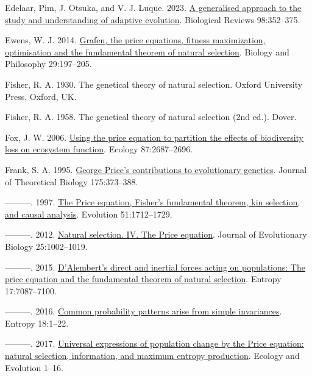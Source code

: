 \documentclass[
]{article}
\newlength{\cslhangindent}
\newenvironment{CSLReferences}[2] %
 {\begin{list}{}{%
  \setlength{\itemindent}{0pt}
  \setlength{\leftmargin}{0pt}
  \setlength{\parsep}{0pt}
  \ifodd #1
   \setlength{\leftmargin}{\cslhangindent}
   \setlength{\itemindent}{-1\cslhangindent}
  \fi
  \setlength{\itemsep}{#2\baselineskip}}}
 {\end{list}}
\begin{document}
\begin{CSLReferences}{0}{0}
Edelaar, Pim, J. Otsuka, and V. J. Luque. 2023.
\href{https://doi.org/10.1111/brv.12910}{{A generalised approach to the
study and understanding of adaptive evolution}}. Biological Reviews
98:352--375.

Ewens, W. J. 2014.
\href{https://doi.org/10.1007/s10539-013-9412-0}{Grafen, the price
equations, fitness maximization, optimisation and the fundamental
theorem of natural selection}. Biology and Philosophy 29:197--205.

Fisher, R. A. 1930. The genetical theory of natural selection. Oxford
University Press, Oxford, UK.

Fisher, R. A. 1958. The genetical theory of natural selection (2nd ed.).
Dover.

Fox, J. W. 2006.
\href{https://doi.org/10.1890/0012-9658(2006)87\%5B2687:utpetp\%5D2.0.co;2}{{Using
the price equation to partition the effects of biodiversity loss on
ecosystem function}}. Ecology 87:2687--2696.

Frank, S. A. 1995. \href{https://doi.org/10.1006/jtbi.1995.0148}{{George
Price's contributions to evolutionary genetics}}. Journal of Theoretical
Biology 175:373--388.

---------. 1997.
\href{https://doi.org/10.1111/j.1558-5646.1997.tb05096.x}{{The Price
equation, Fisher's fundamental theorem, kin selection, and causal
analysis}}. Evolution 51:1712--1729.

---------. 2012.
\href{https://doi.org/10.1111/j.1420-9101.2012.02498.x}{{Natural
selection. IV. The Price equation}}. Journal of Evolutionary Biology
25:1002--1019.

---------. 2015. \href{https://doi.org/10.3390/e17107087}{{D'Alembert's
direct and inertial forces acting on populations: The price equation and
the fundamental theorem of natural selection}}. Entropy 17:7087--7100.

---------. 2016. \href{https://doi.org/10.3390/e18050192}{{Common
probability patterns arise from simple invariances}}. Entropy 18:1--22.

---------. 2017. \href{https://doi.org/10.1002/ece3.2922}{{Universal
expressions of population change by the Price equation: natural
selection, information, and maximum entropy production}}. Ecology and
Evolution 1--16.


\end{CSLReferences}
\end{document}

